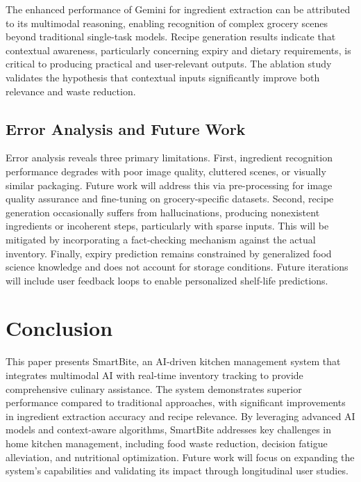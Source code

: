 \documentclass[conference]{IEEEtran}
\begin{document}
The enhanced performance of Gemini for ingredient extraction can be attributed to its multimodal reasoning, enabling recognition of complex grocery scenes beyond traditional single-task models. Recipe generation results indicate that contextual awareness, particularly concerning expiry and dietary requirements, is critical to producing practical and user-relevant outputs. The ablation study validates the hypothesis that contextual inputs significantly improve both relevance and waste reduction.

\subsection{Error Analysis and Future Work}

Error analysis reveals three primary limitations. First, ingredient recognition performance degrades with poor image quality, cluttered scenes, or visually similar packaging. Future work will address this via pre-processing for image quality assurance and fine-tuning on grocery-specific datasets. Second, recipe generation occasionally suffers from hallucinations, producing nonexistent ingredients or incoherent steps, particularly with sparse inputs. This will be mitigated by incorporating a fact-checking mechanism against the actual inventory. Finally, expiry prediction remains constrained by generalized food science knowledge and does not account for storage conditions. Future iterations will include user feedback loops to enable personalized shelf-life predictions.

\section{Conclusion}

This paper presents SmartBite, an AI-driven kitchen management system that integrates multimodal AI with real-time inventory tracking to provide comprehensive culinary assistance. The system demonstrates superior performance compared to traditional approaches, with significant improvements in ingredient extraction accuracy and recipe relevance. By leveraging advanced AI models and context-aware algorithms, SmartBite addresses key challenges in home kitchen management, including food waste reduction, decision fatigue alleviation, and nutritional optimization. Future work will focus on expanding the system's capabilities and validating its impact through longitudinal user studies.



\end{document}
